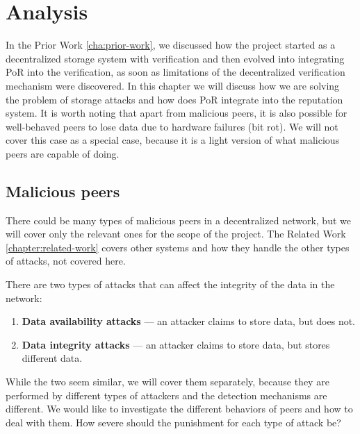 \chapter{Analysis}
\label{chapter:analysis}

In the Prior Work \autoref{cha:prior-work}, we discussed how the project started as a decentralized
storage system with verification and then evolved into integrating PoR into the verification,
as soon as limitations of the decentralized verification mechanism were discovered.
In this chapter we will discuss how we are solving the problem of storage attacks
and how does PoR integrate into the reputation system.
It is worth noting that apart from malicious peers, it is also possible for well-behaved peers to
lose data due to hardware failures (bit rot).
We will not cover this case as a special case, because it is a light version of what malicious
peers are capable of doing.

\section{Malicious peers}

There could be many types of malicious peers in a decentralized network,
but we will cover only the relevant ones for the scope of the project.
The Related Work \autoref{chapter:related-work} covers other systems and
how they handle the other types of attacks, not covered here.

There are two types of attacks that can affect the integrity of the data in the network:
\begin{enumerate}
    \item \textbf{Data availability attacks} --- an attacker claims to store data, but does not.
    \item \textbf{Data integrity attacks} --- an attacker claims to store data, but stores different data.
\end{enumerate}

While the two seem similar, we will cover them separately, because they are performed by different types of attackers
and the detection mechanisms are different.
We would like to investigate the different behaviors of peers and how to deal with them.
How severe should the punishment for each type of attack be?

